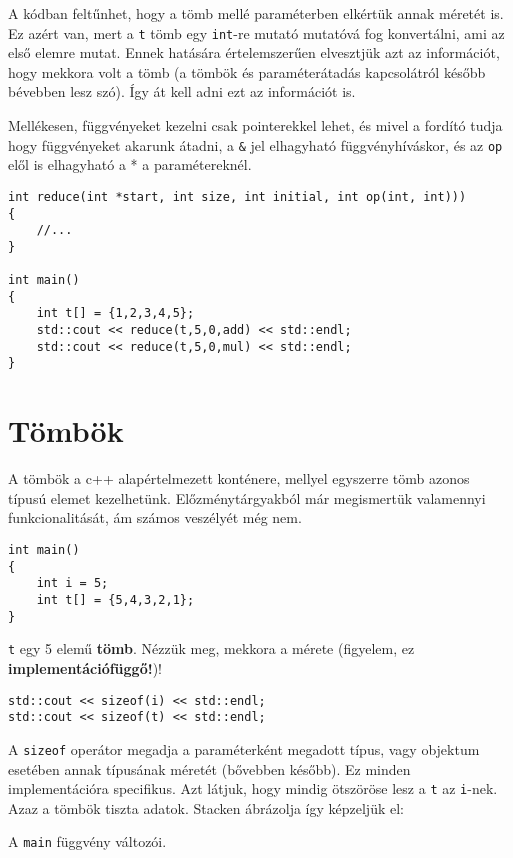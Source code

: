 \documentclass[a4paper,11.5pt,table]{article}
\begin{document}
	A kódban feltűnhet, hogy a tömb mellé paraméterben elkértük annak méretét is. Ez azért van, mert a \texttt{t} tömb egy \texttt{int}-re mutató mutatóvá fog konvertálni, ami az első elemre mutat. Ennek hatására értelemszerűen elvesztjük azt az információt, hogy mekkora volt a tömb (a tömbök és paraméterátadás kapcsolátról később bévebben lesz szó). Így át kell adni ezt az információt is. 
	
	Mellékesen, függvényeket kezelni csak pointerekkel lehet, és mivel a fordító tudja hogy függvényeket akarunk átadni, a \texttt{\&} jel elhagyható függvényhíváskor, és az \texttt{op} elől is elhagyható a * a paramétereknél.
	\begin{lstlisting}
int reduce(int *start, int size, int initial, int op(int, int)))
{
	//...
}

int main()
{
	int t[] = {1,2,3,4,5};
	std::cout << reduce(t,5,0,add) << std::endl;
	std::cout << reduce(t,5,0,mul) << std::endl;
}
	\end{lstlisting}
	\section{Tömbök}
	A tömbök a c++ alapértelmezett konténere, mellyel egyszerre tömb azonos típusú elemet kezelhetünk. Előzménytárgyakból már megismertük valamennyi funkcionalitását, ám számos veszélyét még nem.
		\begin{lstlisting}
int main()
{
	int i = 5;
	int t[] = {5,4,3,2,1};
}
		\end{lstlisting}
		\texttt{t} egy 5 elemű \textbf{tömb}. Nézzük meg, mekkora a mérete (figyelem, ez \textbf{implementációfüggő!})!
		\begin{lstlisting}
std::cout << sizeof(i) << std::endl;
std::cout << sizeof(t) << std::endl;
		\end{lstlisting}
		A \texttt{sizeof} operátor megadja a paraméterként megadott típus, vagy objektum esetében annak típusának méretét (bővebben később). Ez minden implementációra specifikus. Azt látjuk, hogy mindig ötszöröse lesz a \texttt{t} az \texttt{i}-nek. Azaz a tömbök tiszta adatok.  Stacken ábrázolja így képzeljük el:
		
		\begin{center}
			\smallskip
			
			A \texttt{main} függvény változói.
		\end{center}
\end{document}
